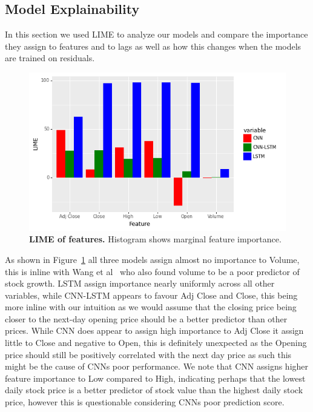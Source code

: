 \documentclass[12pt,journal,compsoc]{IEEEtran}
\begin{document}
\subsection{Model Explainability}
\par In this section we used LIME to analyze our models and compare the importance they assign to features and to lags as well as how this changes when the models are trained on residuals.
\begin{figure}[!ht]\centering
	\includegraphics[width=\linewidth]{images/fig3.png}
	\caption{\textbf{LIME of features.} Histogram shows marginal feature importance.}
	\label{fig:expl1}
\end{figure}
As shown in Figure~\ref{fig:expl1} all three models assign almost no importance to Volume, this is inline with Wang et al~\cite{wang2003} who also found volume to be a poor predictor of stock growth.
LSTM assign importance nearly uniformly across all other variables, while CNN-LSTM appears to favour Adj Close and Close, this being more inline with our intuition as we would assume that the closing price being closer to the next-day opening price should be a better predictor than other prices.
While CNN does appear to assign high importance to Adj Close it assign little to Close and negative to Open, this is definitely unexpected as the Opening price should still be positively correlated with the next day price as such this might be the cause of CNNs poor performance.
We note that CNN assigns higher feature importance to Low compared to High, indicating perhaps that the lowest daily stock price is a better predictor of stock value than the highest daily stock price, however this is questionable considering CNNs poor prediction score.
\end{document}
